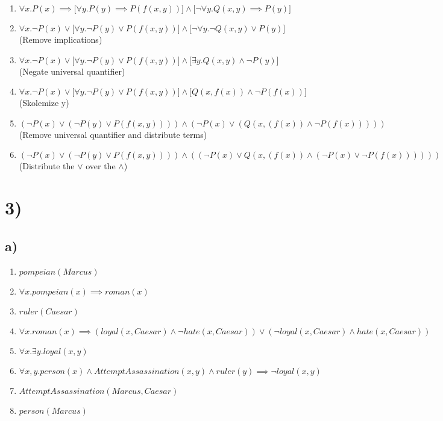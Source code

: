 \documentclass[22pt]{article}
\begin{document}
\begin{enumerate}
	\item $ \forall x. P(x) \implies \big[\forall y. P(y) \implies P(f(x,y))\big] \land \big[ \neg \forall y. Q(x,y) \implies P(y) \big] $
	\item $ \forall x. \neg P(x) \lor \big[\forall y. \neg P(y) \lor P(f(x,y)) \big] \land \big[ \neg \forall y. \neg Q(x,y) \lor P(y) \big]$ (Remove implications)
	\item $ \forall x. \neg P(x) \lor \big[\forall y. \neg P(y) \lor P(f(x,y)) \big] \land \big[\exists y. Q(x,y) \land \neg P(y) \big] $ (Negate universal quantifier)
	\item $ \forall x. \neg P(x) \lor \big[\forall y. \neg P(y) \lor P(f(x,y)) \big] \land \big[Q(x, f(x)) \land \neg P(f(x)) \big] $ (Skolemize y)
	\item $ (\neg P(x) \lor (\neg P(y) \lor P(f(x,y)))) \land (\neg P(x) \lor (Q(x, (f(x)) \land \neg P(f(x))))) $ (Remove universal quantifier and distribute terms)
	\item $ (\neg P(x) \lor (\neg P(y) \lor P(f(x,y)))) \land ((\neg P(x) \lor Q(x, (f(x)) \land (\neg P(x) \lor \neg P(f(x)))))) $ (Distribute the $\lor$ over the $\land$)
\end{enumerate}

\section*{3)}
\subsection*{a)}

\begin{enumerate}
	\item $ pompeian(Marcus) $
	\item $ \forall x. pompeian(x) \implies roman(x) $
	\item $ ruler(Caesar) $
	\item $ \forall x. roman(x) \implies (loyal(x, Caesar) \land \neg hate(x, Caesar))
		\lor (\neg loyal(x, Caesar) \land hate(x, Caesar)) $
	\item $ \forall x. \exists y. loyal(x, y)$
	\item $ \forall x, y. person(x) \land AttemptAssassination(x, y) \land ruler(y)
		\implies \neg loyal(x, y) $
	\item $ AttemptAssassination(Marcus, Caesar) $
	\item $ person(Marcus) $
\end{enumerate}
\end{document}

